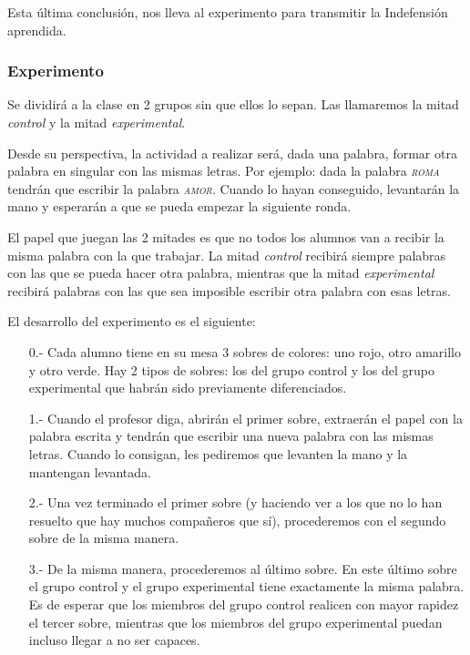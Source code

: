 Esta última conclusión, nos lleva al experimento para transmitir la Indefensión aprendida.

\subsubsection{Experimento}

Se dividirá a la clase en 2 grupos sin que ellos lo sepan.
%
Las llamaremos la mitad \textit{control} y la mitad \textit{experimental}.

Desde su perspectiva, la actividad a realizar será, dada una palabra, formar otra palabra en singular con las mismas letras.
%
Por ejemplo: dada la palabra \textit{\textsc{roma}} tendrán que escribir la palabra \textit{\textsc{amor}}. 
%
Cuando lo hayan conseguido, levantarán la mano y esperarán a que se pueda empezar la siguiente ronda.

El papel que juegan las 2 mitades es que no todos los alumnos van a recibir la misma palabra con la que trabajar. 
%
La mitad \textit{control} recibirá siempre palabras con las que se pueda hacer otra palabra, mientras que la mitad \textit{experimental} recibirá palabras con las que sea imposible escribir otra palabra con esas letras.

El desarrollo del experimento es el siguiente:

\begin{itemize}
	\item[0.-] Cada alumno tiene en su mesa 3 sobres de colores: uno rojo, otro amarillo y otro verde.
	\subitem Hay 2 tipos de sobres: los del grupo control y los del grupo experimental que habrán sido previamente diferenciados.
	\item[1.-] Cuando el profesor diga, abrirán el primer sobre, extraerán el papel con la palabra escrita y tendrán que escribir una nueva palabra con las mismas letras. Cuando lo consigan, les pediremos que levanten la mano y la mantengan levantada.
	\item[2.-] Una vez terminado el primer sobre (y haciendo ver a los que no lo han resuelto que hay muchos compañeros que sí), procederemos con el segundo sobre de la misma manera.
	\item[3.-] De la misma manera, procederemos al último sobre. 
	En este último sobre el grupo control y el grupo experimental tiene exactamente la misma palabra. 
	Es de esperar que los miembros del grupo control realicen con mayor rapidez el tercer sobre, mientras que los miembros del grupo experimental puedan incluso llegar a no ser capaces.
\end{itemize}

